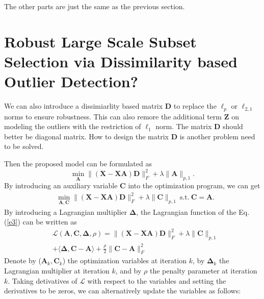 \documentclass[10pt,twocolumn,letterpaper]{article}
\begin{document}
The other parts are just the same as the previous section.


\section{Robust Large Scale Subset Selection via Dissimilarity based Outlier Detection?}


We can also introduce a dissimiarlity based matrix $\bm{D}$ to replace the $\ell_{p}$ or $\ell_{2,1}$ norms to ensure robustness. This can also remore the additional term $\bm{Z}$ on modeling the outliers with the restriction of $\ell_{1}$ norm. The matrix $\bm{D}$ should better be diagonal matrix. How to design the matrix $\bm{D}$ is another problem need to be solved.

Then the proposed model can be formulated as  
\begin{equation}
\label{e2}
\min_{\bm{A}}
\|
(\bm{X}
-
\bm{X}\bm{A})
\bm{D}
\|_{F}^{2}
+
\lambda
\|
\bm{A}
\|_{p,1}
.
\end{equation}
By introducing an auxiliary variable $\bm{C}$ into the optimization program, we can get
\begin{equation}
\begin{split}
\label{e3}
&
\min_{\bm{A},\bm{C}}
\|
(\bm{X}
-
\bm{X}\bm{A})
\bm{D}
\|_{F}^{2}
+
\lambda
\|
\bm{C}
\|_{p,1}
\ 
\text{s.t.}
\ 
\bm{C}=\bm{A}
.
\end{split}
\end{equation}
By introducing a Lagrangian multiplier $\bm{\Delta}$, the Lagrangian function of the Eq. (\ref{e3}) can be written as
\begin{equation}
\begin{split}
\label{e5}
&
\mathcal{L}
(\bm{A},\bm{C},\bm{\Delta},\rho)
=
\|
(\bm{X}
-
\bm{X}\bm{A})
\bm{D}
\|_{F}^{2}
+
\lambda
\|
\bm{C}
\|_{p,1}
\\
&
+
\langle
\bm{\Delta},
\bm{C}-\bm{A}
\rangle
+
\frac{\rho}{2}
\|
\bm{C}
-
\bm{A}
\|_{F}^{2}
\end{split}
\end{equation}
Denote by ($\bm{A}_{k},\bm{C}_{k}$) the optimization variables at iteration $k$, by $\bm{\Delta}_{k}$ the Lagrangian multiplier at iteration $k$, and by $\rho$ the penalty parameter at iteration $k$. Taking detivatives of $\mathcal{L}$ with respect to the variables and setting the derivatives to be zeros, we can alternatively update the variables as follows:
\end{document}
